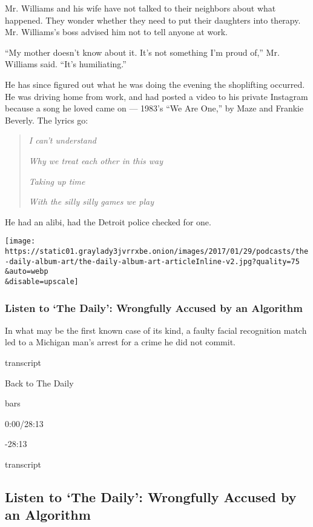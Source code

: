 Mr. Williams and his wife have not talked to their neighbors about what
happened. They wonder whether they need to put their daughters into
therapy. Mr. Williams's boss advised him not to tell anyone at work.

``My mother doesn't know about it. It's not something I'm proud of,''
Mr. Williams said. ``It's humiliating.''

He has since figured out what he was doing the evening the shoplifting
occurred. He was driving home from work, and had posted a video to his
private Instagram because a song he loved came on --- 1983's ``We Are
One,'' by Maze and Frankie Beverly. The lyrics go:

\begin{quote}
\emph{I can't understand}

\emph{Why we treat each other in this way}

\emph{Taking up time}

\emph{With the silly silly games we play}
\end{quote}

He had an alibi, had the Detroit police checked for one.

\texttt{[image: https://static01.graylady3jvrrxbe.onion/images/2017/01/29/podcasts/the-daily-album-art/the-daily-album-art-articleInline-v2.jpg?quality=75\\\&auto=webp\\\&disable=upscale]}

\hypertarget{listen-to-the-daily-wrongfully-accused-by-an-algorithm}{%
\subsubsection{Listen to `The Daily': Wrongfully Accused by an
Algorithm}\label{listen-to-the-daily-wrongfully-accused-by-an-algorithm}}

In what may be the first known case of its kind, a faulty facial
recognition match led to a Michigan man's arrest for a crime he did not
commit.

transcript

Back to The Daily

bars

0:00/28:13

-28:13

transcript

\hypertarget{listen-to-the-daily-wrongfully-accused-by-an-algorithm-1}{%
\subsection{Listen to `The Daily': Wrongfully Accused by an
Algorithm}\label{listen-to-the-daily-wrongfully-accused-by-an-algorithm-1}}

